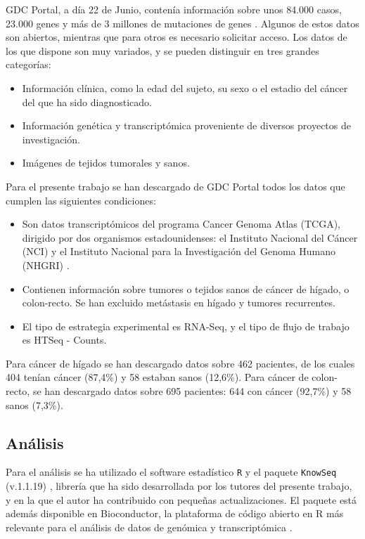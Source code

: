 GDC Portal, a día 22 de Junio, contenía información sobre unos 84.000 casos, 23.000 genes y más de 3 millones de mutaciones de genes \cite{GDCPortal}. Algunos de estos datos son abiertos, mientras que para otros es necesario solicitar acceso. Los datos de los que dispone son muy variados, y se pueden distinguir en tres grandes categorías:

\begin{itemize}
	\item Información clínica, como la edad del sujeto, su sexo o el estadio del cáncer del que ha sido diagnosticado.
	\item Información genética y transcriptómica proveniente de diversos proyectos de investigación.
	\item Imágenes de tejidos tumorales y sanos.
\end{itemize} 

Para el presente trabajo se han descargado de GDC Portal todos los datos que cumplen las siguientes condiciones:

\begin{itemize}
	\item Son datos transcriptómicos del programa Cancer Genoma Atlas (TCGA), dirigido por dos organismos estadounidenses: el Instituto Nacional del Cáncer (NCI) y el Instituto Nacional para la Investigación del Genoma Humano (NHGRI) \cite{NationalCancerInstitutea}. 
	\item Contienen información sobre tumores o tejidos sanos de cáncer de hígado, o colon-recto. Se han excluido metástasis en hígado y tumores recurrentes.
	\item El tipo de estrategia experimental es RNA-Seq, y el tipo de flujo de trabajo es HTSeq - Counts.
\end{itemize}

Para cáncer de hígado se han descargado datos sobre 462 pacientes, de los cuales 404 tenían cáncer (87,4\%) y 58 estaban sanos (12,6\%).  Para cáncer de colon-recto, se han descargado datos sobre 695 pacientes: 644 con cáncer (92,7\%) y 58 sanos (7,3\%).

\subsection{Análisis}

Para el análisis se ha utilizado el software estadístico \texttt{R} \cite{R} y el paquete \texttt{KnowSeq} (v.1.1.19) \cite{KnowSeq}, librería que ha sido desarrollada por los tutores del presente trabajo, y en la que el autor ha contribuido con pequeñas actualizaciones. El paquete está además disponible en Bioconductor, la plataforma de código abierto en R más relevante para el análisis de datos de genómica y transcriptómica \cite{Gentleman2004}.\\

